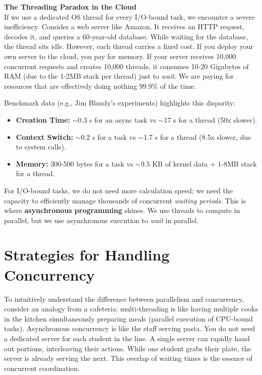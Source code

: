\begin{insightbox}
\textbf{The Threading Paradox in the Cloud} \\
If we use a dedicated OS thread for every I/O-bound task, we encounter a severe inefficiency. Consider a web server like Amazon. It receives an HTTP request, decodes it, and queries a 60-year-old database. While waiting for the database, the thread sits idle. However, each thread carries a fixed cost. If you deploy your own server to the cloud, you pay for memory. If your server receives 10,000 concurrent requests and creates 10,000 threads, it consumes 10-20 Gigabytes of RAM (due to the 1-2MB stack per thread) just to \textit{wait}. We are paying for resources that are effectively doing nothing 99.9\% of the time. 

Benchmark data (e.g., Jim Blandy's experiments) highlights this disparity:
\begin{itemize}
    \item \textbf{Creation Time:} $\sim$0.3 \textmu s for an async task vs $\sim$17 \textmu s for a thread (50x slower).
    \item \textbf{Context Switch:} $\sim$0.2 \textmu s for a task vs $\sim$1.7 \textmu s for a thread (8.5x slower, due to system calls).
    \item \textbf{Memory:} 300-500 bytes for a task vs $\sim$9.5 KB of kernel data + 1-8MB stack for a thread.
\end{itemize}
\end{insightbox}

For I/O-bound tasks, we do not need more calculation speed; we need the capacity to efficiently manage thousands of concurrent \textit{waiting periods}. This is where \textbf{asynchronous programming} shines. We use threads to compute in parallel, but we use asynchronous execution to \textit{wait} in parallel.

\section{Strategies for Handling Concurrency}

To intuitively understand the difference between parallelism and concurrency, consider an analogy from a cafeteria: multi-threading is like having multiple cooks in the kitchen simultaneously preparing meals (parallel execution of CPU-bound tasks). Asynchronous concurrency is like the staff serving pasta. You do not need a dedicated server for each student in the line. A single server can rapidly hand out portions, interleaving their actions. While one student grabs their plate, the server is already serving the next. This overlap of waiting times is the essence of concurrent coordination.

